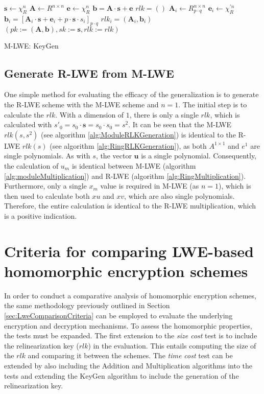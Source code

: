 \begin{algorithm}[htb]
  \begin{algorithmic}[1]
    \STATE $\textbf{s} \leftarrow \chi_R^n$
    \STATE $\textbf{A} \leftarrow R^{n \times n}$
    \STATE $\textbf{e} \leftarrow \chi_R^n$
    \STATE $\textbf{b} = \textbf{A}\cdot \textbf{s}+\textbf{e}$
    \STATE $rlk = ()$
    \STATE $\textbf{A}_i \leftarrow R_{p \cdot q}^{n \times n}$
    \STATE $\textbf{e}_i \leftarrow \chi_R^{'n}$
    \STATE $\textbf{b}_i = [\textbf{A}_i\cdot \textbf{s}+\textbf{e}_i+p\cdot \textbf{s} \cdot s_i]_{p \cdot q}$
    \STATE $rlk_i = (\textbf{A}_i, \textbf{b}_i)$
    \ENDFOR
    \RETURN $(pk:=(\textbf{A}, \textbf{b}), sk:=\textbf{s}, rlk:= rlk )$
  \end{algorithmic}
  \caption{M-LWE: KeyGen}
  \label{alg:HomomorphKeyGen}
\end{algorithm}

\subsection*{Generate R-LWE from M-LWE}

One simple method for evaluating the efficacy of the generalization is to generate the R-LWE scheme with the M-LWE scheme and $n=1$. The initial step is to calculate the $rlk$. With a dimension of $1$, there is only a single $rlk$, which is calculated with $s'_0 = s_0 \cdot \textbf{s} = s_0 \cdot s_0 = s^2$. It can be seen that the M-LWE $rlk(s, s^2)$ (see algorithm \ref{alg:ModuleRLKGeneration}) is identical to the R-LWE $rlk(s)$ (see algorithm \ref{alg:RingRLKGeneration}), as both $A^{1 \times 1}$ and $e^1$ are single polynomials. As with $s$, the vector $\textbf{u}$ is a single polynomial. Consequently, the calculation of $u_m$ is identical between M-LWE (algorithm \ref{alg:moduleMultiplication}) and R-LWE (algorithm \ref{alg:RingMultiplication}). Furthermore, only a single $x_m$ value is required in M-LWE (as $n=1$), which is then used to calculate both $xu$ and $xv$, which are also single polynomials. Therefore, the entire calculation is identical to the R-LWE multiplication, which is a positive indication.


\section{Criteria for comparing LWE-based homomorphic encryption schemes}
\label{sec:HomomorphCriteria}

In order to conduct a comparative analysis of homomorphic encryption schemes, the same methodology previously outlined in Section \ref{sec:LweComparisonCriteria} can be employed to evaluate the underlying encryption and decryption mechanisms. To assess the homomorphic properties, the tests must be expanded. The first extension to the \textit{size cost} test is to include the relinearization key ($rlk$) in the evaluation. This entails computing the size of the $rlk$ and comparing it between the schemes. The \textit{time cost} test can be extended by also including the Addition and Multiplication algorithms into the tests and extending the KeyGen algorithm to include the generation of the relinearization key.

